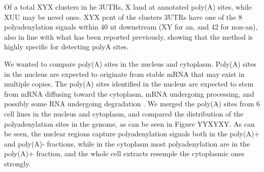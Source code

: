 \documentclass[a4paper]{article}
\begin{document}
Of a total XYX clusters in he 3UTRs, X land at annotated
poly(A) sites, while XUU may be novel ones. XYX pcnt of the clusters 3UTRs have
one of the 8 polyadenylation signals within 40 nt downstream (XY for an, and 42
for non-an), also in line with what has been reported previously, showing that
the method is highly specific for detecting polyA sites.

We wanted to compare poly(A) sites in the nucleus and cytoplasm. Poly(A) sites
in the nucleus are expected to originate from stable mRNA that may exist in
multiple copies. The poly(A) sites identified in the nucleus are expected to
stem from mRNA diffusing toward the cytoplasm, mRNA undergoing
processing, and possibly some RNA undergoing degradation
\cite{shcherbik_polyadenylation_2010,slomovic_addition_2010}. We merged the
poly(A) sites from 6 cell lines in the nucleus and cytoplasm, and compared the
distribution of the polyadenylation sites in the genome, as can be seen in
Figure YYXYXY. As can be seen, the nuclear regions capture polyadenylation
signals both in the poly(A)+ and poly(A)- fractions, while in the cytoplasm
most polyadenylation are in the poly(A)+ fraction, and the whole cell extracts
resemple the cytoplasmic ones strongly.



\end{document}
